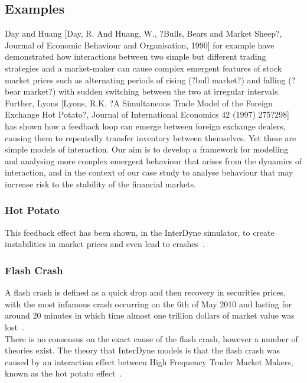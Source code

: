 \documentclass{article}
\begin{document}
\subsection{Examples}


Day and Huang [Day, R. And Huang, W., ?Bulls, Bears and Market Sheep?, Jourmal of Economic Behaviour and Organisation, 1990] for example have demonstrated how interactions between two simple but different trading strategies and a market-maker can cause complex emergent features of stock market prices such as alternating periods of rising (?bull market?) and falling (?bear market?) with sudden switching between the two at irregular intervals. Further, Lyons [Lyons, R.K. ?A Simultaneous Trade Model of the Foreign Exchange Hot Potato?, Journal of International Economics 42 (1997) 275?298] has shown how a feedback loop can emerge between foreign exchange dealers, causing them to repeatedly transfer inventory between themselves.  Yet these are simple models of interaction.  Our aim is to develop a framework for modelling and analysing more complex emergent behaviour that arises from the dynamics of interaction, and in the context of our case study to analyse behaviour that may increase risk to the stability of the financial markets.

\subsubsection{Hot Potato} 



This feedback effect has been shown, in the InterDyne simulator, to create instabilities in market prices and even lead to crashes~\cite{DynamicCoupling_Chris}.   






\subsubsection{Flash Crash}
 
A flash crash is defined as a quick drop and then recovery in securities prices, with the most infamous  crash occurring on the 6th of May 2010 and lasting for around 20 minutes in which time almost one trillion dollars of market value was lost~\cite{Vikram_Paper}.\\
There is no consensus on the exact cause of the flash crash, however a number of theories exist. The theory that InterDyne models is that the flash crash was caused by an interaction effect between High Frequency Trader Market Makers, known as the hot potato effect~\cite{Elias_Paper}. 
\end{document}
